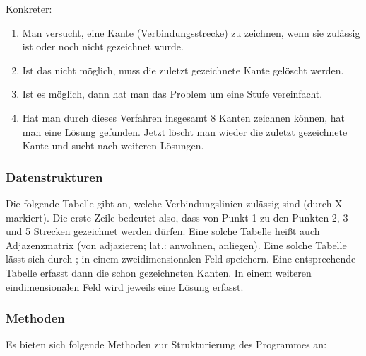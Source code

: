 \documentclass{bschlangaul-aufgabe}
\begin{document}
\noindent
Konkreter:

\begin{enumerate}
\item Man versucht, eine Kante (Verbindungsstrecke) zu zeichnen, wenn
sie zulässig ist oder noch nicht gezeichnet wurde.

\item Ist das nicht möglich, muss die zuletzt gezeichnete Kante gelöscht
werden.

\item  Ist es möglich, dann hat man das Problem um eine Stufe
vereinfacht.

\item  Hat man durch dieses Verfahren insgesamt 8 Kanten zeichnen
können, hat man eine Lösung gefunden. Jetzt löscht man wieder die
zuletzt gezeichnete Kante und sucht nach weiteren Lösungen.
\end{enumerate}


\subsubsection{Datenstrukturen}

Die folgende Tabelle gibt an, welche Verbindungslinien zulässig sind
(durch X markiert). Die erste Zeile bedeutet also, dass von Punkt 1 zu
den Punkten 2, 3 und 5 Strecken gezeichnet werden dürfen. Eine solche
Tabelle heißt auch Adjazenzmatrix (von adjazieren; lat.: anwohnen,
anliegen). Eine solche Tabelle lässt sich durch ; in einem zweidimensionalen Feld speichern. Eine
entsprechende Tabelle  erfasst dann die
schon gezeichneten Kanten. In einem weiteren eindimensionalen Feld
wird jeweils eine Lösung erfasst.

\subsubsection{Methoden}

Es bieten sich folgende Methoden zur Strukturierung des Programmes an:
\end{document}
